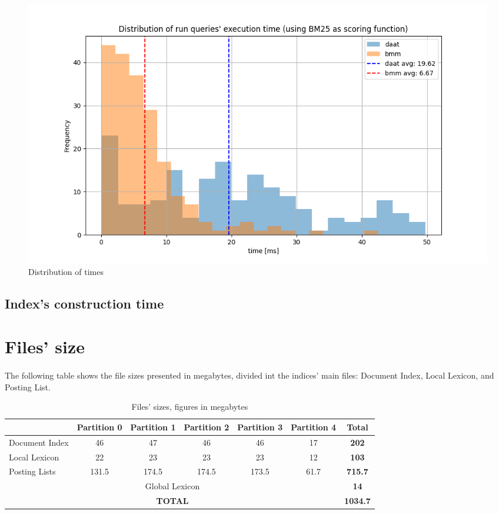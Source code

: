 \documentclass[parskip=full]{report}
\begin{document}
	\begin{figure}[H]
		\centering
		\includegraphics[width=1\textwidth]{assets/times_distrib.png}
		\caption{Distribution of times}
		\label{fig:time_distribution}
	\end{figure}
	
\subsection{Index's construction time}

	
\section{Files' size}

\paragraph{}
The following table shows the file sizes presented in megabytes, divided int the indices' main files: Document Index, Local Lexicon, and Posting List.

\begin{table}[H]
	\centering
	\begin{tabular}{|l|*{5}{c|}c|}
		\hline
		& \textbf{Partition 0} & \textbf{Partition 1} & \textbf{Partition 2} & \textbf{Partition 3} & \textbf{Partition 4} & \textbf{Total} \\
		\hline
		Document Index & 46 & 47 & 46 & 46 & 17 & \textbf{202} \\
		Local Lexicon & 22 & 23 & 23 & 23 & 12 & \textbf{103} \\
		Posting Lists & 131.5 & 174.5 & 174.5 & 173.5 & 61.7 & \textbf{715.7} \\
		\hline
		\multicolumn{6}{|c|}{Global Lexicon} & \textbf{14} \\
		\hline
		\multicolumn{6}{|c|}{\textbf{TOTAL}} & \textbf{1034.7} \\
		\hline
	\end{tabular}
	\caption{Files' sizes, figures in megabytes}
	\label{tab:spanning_table}
\end{table}
\end{document}
